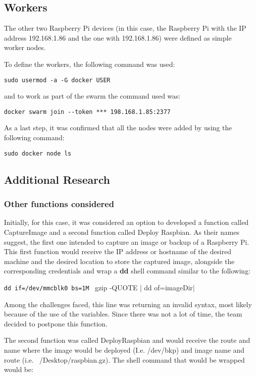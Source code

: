 \subsection{Workers}

The other two Raspberry Pi devices (in this case, the Raspberry Pi
with the IP address 192.168.1.86 and the one with 192.168.1.86) were
defined as simple worker nodes.
  
To define the workers, the following command was used:

\verb|sudo usermod -a -G docker USER|

and to work as part of the swarm the command used was:

\verb|docker swarm join --token *** 198.168.1.85:2377| 

As a
last step, it was confirmed that all the nodes were added by using the
following command: 

\verb|sudo docker node ls|
	
\subsection{Additional Research}
	
\subsubsection{Other functions considered}

Initially, for this case, it was considered an option to developed a
function called CaptureImage and a second function called Deploy
Raspbian.  As their names suggest, the first one intended to capture
an image or backup of a Raspberry Pi.  This first function would
receive the IP address or hostname of the desired machine and the
desired location to store the captured image, alongside the
corresponding credentials and wrap
a \textbf{dd} shell command similar to the following:

\verb|dd if=/dev/mmcblk0 bs=1M | gzip -QUOTE | dd of=imageDir|

Among the challenges faced, this line was returning an invalid syntax,
most likely because of the use of the variables.  Since there was not
a lot of time, the team decided to
postpone this function.
	
The second function was called DeployRaspbian and would receive the
route and name where the image would be deployed (I.e. /dev/bkp) and
image name and route (i.e. ~/Desktop/raspbian.gz). The shell command
that would be wrapped would be: 

